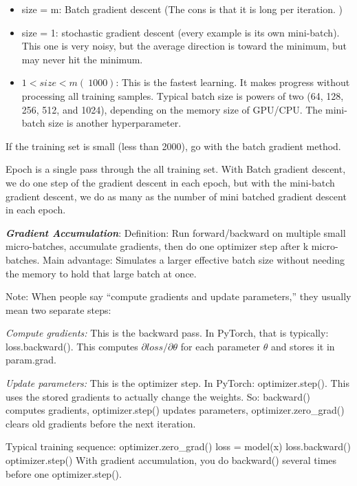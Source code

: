 \documentclass[12pt]{report}
\begin{document}
\begin{itemize}
  \item size = m: Batch gradient descent (The cons is that it is long per iteration. )
  \item size = 1: stochastic gradient descent (every example is its own mini-batch). This one is very noisy, but the average direction is toward the minimum, but may never hit the minimum.
  \item $1< size < m (~1000)$: This is the fastest learning. It makes progress without processing all training samples. Typical batch size is powers of two (64, 128, 256, 512, and 1024), depending on the memory size of GPU/CPU. The mini-batch size is another hyperparameter.
\end{itemize}

If the training set is small (less than 2000), go with the batch gradient method.

Epoch is a single pass through the all training set. With Batch gradient descent, we do one step of the gradient descent in each epoch, but with the mini-batch gradient descent, we do as many as the number of mini batched gradient descent in each epoch.


\textbf{\textit{Gradient Accumulation}}:
Definition: Run forward/backward on multiple small micro-batches, accumulate gradients, then do one optimizer step after 
k micro-batches.
Main advantage: Simulates a larger effective batch size without needing the memory to hold that large batch at once.


Note:
When people say “compute gradients and update parameters,” they usually mean two separate steps:

\textit{Compute gradients:}
This is the backward pass. In PyTorch, that is typically: loss.backward(). This computes 
 $\partial loss/ \partial \theta$ for each parameter $\theta$ and stores it in param.grad.

\textit{Update parameters:}
This is the optimizer step. In PyTorch: optimizer.step(). This uses the stored gradients to actually change the weights. So:
backward() computes gradients, optimizer.step() updates parameters, optimizer.zero\_grad() clears old gradients before the next iteration.

Typical training sequence:
optimizer.zero\_grad()
loss = model(x)
loss.backward()
optimizer.step()
With gradient accumulation, you do backward() several times before one optimizer.step().
\end{document}
